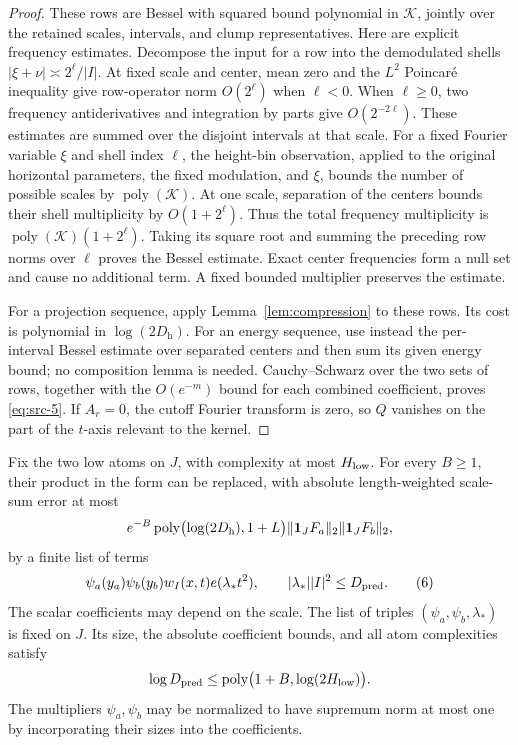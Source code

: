 \begin{proof}
These rows are Bessel with squared bound polynomial in $\mathcal K$,
jointly over the retained scales, intervals, and clump representatives.
Here are explicit frequency estimates.  Decompose the input for a row
into the demodulated shells
$|\xi+\nu|\asymp2^\ell/|I|$.  At fixed scale and center, mean zero and
the $L^2$ Poincar\'e inequality give row-operator norm $O(2^\ell)$ when
$\ell<0$.  When $\ell\ge0$, two frequency antiderivatives and
integration by parts give $O(2^{-2\ell})$.  These estimates are summed
over the disjoint intervals at that scale.
For a fixed Fourier variable $\xi$ and shell index $\ell$, the
height-bin observation, applied to the original horizontal parameters,
the fixed modulation, and $\xi$, bounds the number of possible scales
by $\operatorname{poly}(\mathcal K)$.  At one scale, separation of the
centers bounds their shell multiplicity by $O(1+2^\ell)$.  Thus the
total frequency multiplicity is
$\operatorname{poly}(\mathcal K)(1+2^\ell)$.  Taking its square root
and summing the preceding row norms over $\ell$ proves the Bessel
estimate.  Exact center frequencies form a null set and cause no
additional term.  A fixed bounded multiplier preserves the estimate.

For a projection sequence, apply Lemma~\ref{lem:compression} to these
rows.  Its cost is polynomial in $\log(2D_{\mathrm h})$.  For an energy
sequence, use instead the per-interval Bessel estimate over separated
centers and then sum its given energy bound; no composition lemma is
needed.  Cauchy--Schwarz over the two sets of rows, together with the
$O(e^{-m})$ bound for each combined coefficient, proves
\eqref{eq:src-5}.  If $A_r=0$, the cutoff Fourier transform is zero,
so $Q$ vanishes on the part of the $t$-axis relevant to the kernel.
\end{proof}

\begin{corollary}
\label{cor:predictor-list}
Fix the two low atoms on $J$, with complexity at most $H_{\rm low}$.
For every $B\ge1$, their product in the form can be replaced, with
absolute length-weighted scale-sum error at most
\[
 e^{-B}\operatorname{poly}\bigl(\log(2D_{\mathrm h}),1+L\bigr)
 \|\mathbf 1_JF_a\|_2\|\mathbf 1_JF_b\|_2,
\]
by a finite list of terms
\begin{equation*}
 \psi_a(y_a)\psi_b(y_b)w_I(x,t)e(\lambda_*t^2),
 \qquad |\lambda_*||I|^2\le D_{\rm pred}.
\tag{6}\label{eq:src-6}
\end{equation*}
The scalar coefficients may depend on the scale.  The list of triples
$(\psi_a,\psi_b,\lambda_*)$ is fixed on $J$.  Its size, the absolute
coefficient bounds, and all atom complexities satisfy
\[
 \log D_{\rm pred}
 \le\operatorname{poly}\bigl(1+B,\log(2H_{\rm low})\bigr).
\]
The multipliers $\psi_a,\psi_b$ may be normalized to have supremum norm
at most one by incorporating their sizes into the coefficients.
\end{corollary}

